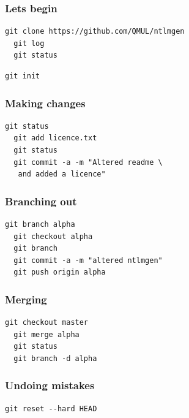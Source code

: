\documentclass{beamer}
\begin{document}
\begin{frame}[fragile]
  \frametitle{Lets begin}

  \begin{lstlisting}[caption=clone a repository] 
  git clone https://github.com/QMUL/ntlmgen
  git log
  git status
  \end{lstlisting}

  \begin{lstlisting}[caption=create a new repository] 
  git init 
  \end{lstlisting}

\end{frame}


\begin{frame}[fragile]
  \frametitle{Making changes}
  
  \begin{lstlisting}[caption=Making changes] 
  git status
  git add licence.txt
  git status
  git commit -a -m "Altered readme \
   and added a licence"
  \end{lstlisting}

\end{frame}


\begin{frame}[fragile]
  \frametitle{Branching out}
  
  \begin{lstlisting}[caption=Branching] 
  git branch alpha
  git checkout alpha
  git branch
  git commit -a -m "altered ntlmgen"
  git push origin alpha
  \end{lstlisting}

\end{frame}


\begin{frame}[fragile]
  \frametitle{Merging}
  
  \begin{lstlisting}[caption=Merging] 
  git checkout master
  git merge alpha
  git status
  git branch -d alpha
  \end{lstlisting}

\end{frame}



\begin{frame}[fragile]
  \frametitle{Undoing mistakes}
  
  \begin{lstlisting}[caption=Hard Reset] 
  git reset --hard HEAD
  \end{lstlisting}

\end{frame}
\end{document}
